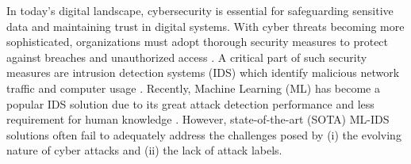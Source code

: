 
In today’s digital landscape, cybersecurity is essential for safeguarding sensitive data and maintaining trust in digital systems. With cyber threats becoming more sophisticated, organizations must adopt thorough security measures to protect against breaches and unauthorized access \cite{emerging2023kumar}. A critical part of such security measures are intrusion detection systems (IDS) which identify malicious network traffic and computer usage \cite{liao2013intrusion}. Recently, Machine Learning (ML) has become a popular IDS solution due to its great attack detection performance and less requirement for human knowledge \cite{gungor2024roldef}. However, state-of-the-art (SOTA) ML-IDS solutions often fail to adequately address the challenges posed by (i) the evolving nature of cyber attacks and (ii) the lack of attack labels.


